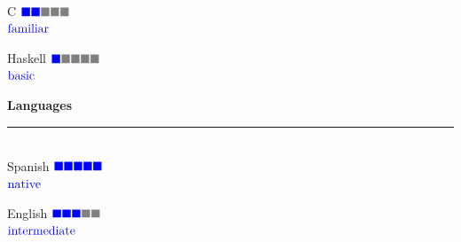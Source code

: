 \documentclass{article}
\begin{document}
\begin{minipage}[t]{0.3\linewidth}
  \large C \hfill $\color{blue} \blacksquare \color{blue} \blacksquare \color{gray} \blacksquare \color{gray} \blacksquare  \color{gray} \blacksquare$  \\[-0.8mm]
  \null\hfill \small{ $\color{blue} \textnormal{familiar}$}

  \large Haskell \hfill $\color{blue} \blacksquare \color{gray} \blacksquare \color{gray} \blacksquare \color{gray} \blacksquare  \color{gray} \blacksquare$  \\[-0.8mm]
  \null\hfill \small{ $\color{blue} \textnormal{basic}$}

  \textbf{\Large{\color{BlueViolet}Languages}}\\[-0.25cm]
  {\color{BlueViolet} \rule{\linewidth}{0.1mm} }\\
  \large Spanish \hfill $\color{blue} \blacksquare\color{blue} \blacksquare \color{blue} \blacksquare \color{blue} \blacksquare  \color{blue} \blacksquare$  \\[-0.8mm]
  \null\hfill \small{ $\color{blue} \textnormal{native}$}

  \large English \hfill $\color{blue} \blacksquare\color{blue} \blacksquare \color{blue} \blacksquare \color{gray} \blacksquare  \color{gray} \blacksquare$  \\[-0.8mm]
  \null\hfill \small{ $\color{blue} \textnormal{intermediate}$}
  
\end{minipage}
\hspace{0.25cm}\vline\hspace{0.25cm}
\end{document}
